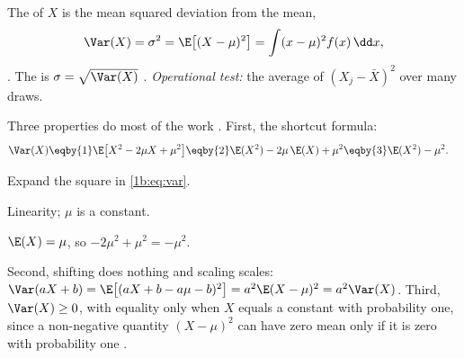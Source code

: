 \begin{workdef}
The  of $X$ is the mean squared deviation from the mean,
\begin{equation}
  \Var(X)=\sigma^2=\E\bigl[(X-\mu)^2\bigr]
  =\int(x-\mu)^2f(x)\,\dd x ,
  \label{1b:eq:var}
\end{equation}
. The  is
$\sigma=\sqrt{\Var(X)}$ .
\emph{Operational test:} the average of $(X_j-\bar X)^2$ over many draws.
\end{workdef}

Three properties do most of the work .
First, the shortcut formula:
\begin{align}
  \Var(X)
  &\eqby{1} \E\bigl[X^2-2\mu X+\mu^2\bigr]
   \eqby{2} \E(X^2)-2\mu\,\E(X)+\mu^2
   \eqby{3} \E(X^2)-\mu^2 .
  \label{1b:eq:var-short}
\end{align}
\begin{explain}
  \item Expand the square in \eqref{1b:eq:var}.
  \item Linearity; $\mu$ is a constant.
  \item $\E(X)=\mu$, so $-2\mu^2+\mu^2=-\mu^2$.
\end{explain}
Second, shifting does nothing and scaling scales:
$\Var(aX+b)=\E\bigl[(aX+b-a\mu-b)^2\bigr]=a^2\E(X-\mu)^2=a^2\Var(X)$.
Third, $\Var(X)\ge0$, with equality only when $X$ equals a constant with
probability one, since a non-negative quantity $(X-\mu)^2$ can have zero mean
only if it is zero with probability one .

